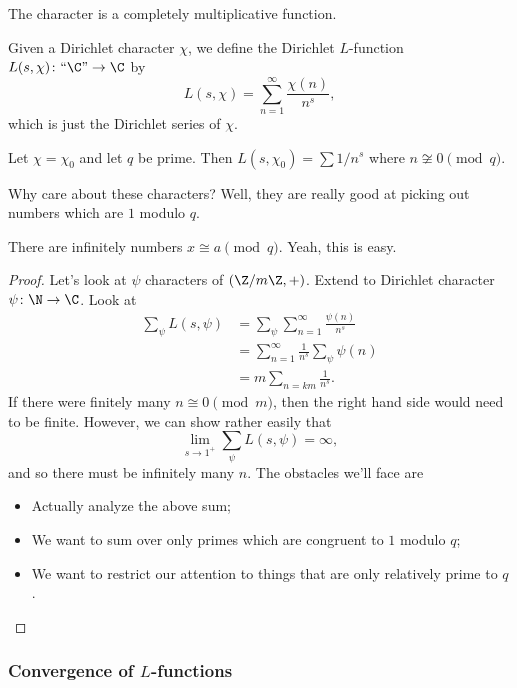 The character is a completely multiplicative function.

\begin{definition}[$L$-function]
	Given a Dirichlet character $\chi$, we define the Dirichlet $L$-function 
	$L(s,\chi)\colon \text{``$\C$''} \to \C$ by 
	\[ 
		L(s,\chi) = \sum_{n=1}^\infty \frac{\chi(n)}{n^s},
	\]
	which is just the Dirichlet series of $\chi$.
\end{definition}

\begin{example}
	Let $\chi = \chi_0$ and let $q$ be prime.
	Then $L(s, \chi_0) = \sum 1/n^s$ where $n \not\cong 0 \pmod{q}$.
\end{example}

\begin{remark*}
	Why care about these characters? Well, they are really good at picking out
	numbers which are $1$ modulo $q$.
\end{remark*}

\begin{theorem*}
	There are infinitely numbers $x \cong a \pmod{q}$.
	Yeah, this is easy.
\end{theorem*}

\begin{proof}
	Let's look at $\psi$ characters of $(\Z/m\Z, +)$.
	Extend to Dirichlet character $\psi\colon \N \to \C$.
	Look at 
	\begin{align*}
		\sum_{\psi} L(s,\psi) &= \sum_\psi \sum_{n=1}^\infty \frac{\psi(n)}{n^s} \\
							&= \sum_{n=1}^\infty \frac{1}{n^s}\sum_\psi \psi(n) \\
							  &= m \sum_{n =km } \frac{1}{n^s}.
	\end{align*}
	If there were finitely many $n \cong 0 \pmod{m}$, then the right hand side
	would need to be finite.
	However, we can show rather easily that
	\[ \lim_{s \to 1^+} \sum_\psi L(s,\psi) = \infty, \]
	and so there must be infinitely many $n$.
	The obstacles we'll face are 
	\begin{itemize}
		\item Actually analyze the above sum;
		\item We want to sum over only primes which are congruent to $1$ modulo
		$q$;
		\item We want to restrict our attention to things that are only 
		relatively prime to $q$.
	\end{itemize}
\end{proof}

\subsubsection*{Convergence of \texorpdfstring{$L$}{L}-functions}

